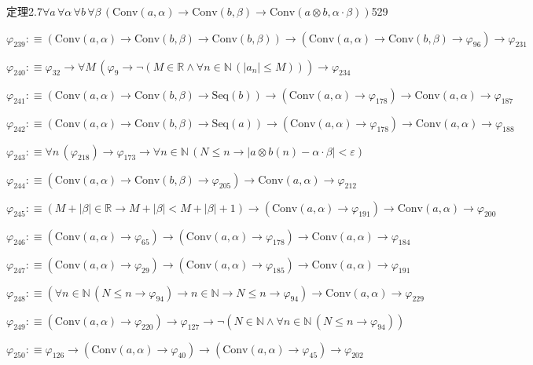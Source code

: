 \begin{fullproof}{定理2.7}{$\forall a\,\forall \alpha\,\forall b\,\forall \beta\,(\mathrm{Conv}(a,\alpha) \to \mathrm{Conv}(b,\beta) \to \mathrm{Conv}(a \otimes b,\alpha \cdot \beta))$}{529}
\begin{abbrevlist}
\item $\varphi_{239} :\equiv (\mathrm{Conv}(a,\alpha) \to \mathrm{Conv}(b,\beta) \to \mathrm{Conv}(b,\beta)) \to (\mathrm{Conv}(a,\alpha) \to \mathrm{Conv}(b,\beta) \to \varphi_{96}) \to \varphi_{231}$
\item $\varphi_{240} :\equiv \varphi_{32} \to \forall M\,(\varphi_{9} \to \neg (M \in \mathbb{R} \land \forall n \in \mathbb{N}\,(\lvert a_{n} \rvert \leq M))) \to \varphi_{234}$
\item $\varphi_{241} :\equiv (\mathrm{Conv}(a,\alpha) \to \mathrm{Conv}(b,\beta) \to \mathrm{Seq}(b)) \to (\mathrm{Conv}(a,\alpha) \to \varphi_{178}) \to \mathrm{Conv}(a,\alpha) \to \varphi_{187}$
\item $\varphi_{242} :\equiv (\mathrm{Conv}(a,\alpha) \to \mathrm{Conv}(b,\beta) \to \mathrm{Seq}(a)) \to (\mathrm{Conv}(a,\alpha) \to \varphi_{178}) \to \mathrm{Conv}(a,\alpha) \to \varphi_{188}$
\item $\varphi_{243} :\equiv \forall n\,(\varphi_{218}) \to \varphi_{173} \to \forall n \in \mathbb{N}\,(N \leq n \to \lvert a \otimes b(n) - \alpha \cdot \beta \rvert < \varepsilon)$
\item $\varphi_{244} :\equiv (\mathrm{Conv}(a,\alpha) \to \mathrm{Conv}(b,\beta) \to \varphi_{205}) \to \mathrm{Conv}(a,\alpha) \to \varphi_{212}$
\item $\varphi_{245} :\equiv (M + \lvert \beta \rvert \in \mathbb{R} \to M + \lvert \beta \rvert < M + \lvert \beta \rvert + 1) \to (\mathrm{Conv}(a,\alpha) \to \varphi_{191}) \to \mathrm{Conv}(a,\alpha) \to \varphi_{200}$
\item $\varphi_{246} :\equiv (\mathrm{Conv}(a,\alpha) \to \varphi_{65}) \to (\mathrm{Conv}(a,\alpha) \to \varphi_{178}) \to \mathrm{Conv}(a,\alpha) \to \varphi_{184}$
\item $\varphi_{247} :\equiv (\mathrm{Conv}(a,\alpha) \to \varphi_{29}) \to (\mathrm{Conv}(a,\alpha) \to \varphi_{185}) \to \mathrm{Conv}(a,\alpha) \to \varphi_{191}$
\item $\varphi_{248} :\equiv (\forall n \in \mathbb{N}\,(N \leq n \to \varphi_{94}) \to n \in \mathbb{N} \to N \leq n \to \varphi_{94}) \to \mathrm{Conv}(a,\alpha) \to \varphi_{229}$
\item $\varphi_{249} :\equiv (\mathrm{Conv}(a,\alpha) \to \varphi_{220}) \to \varphi_{127} \to \neg (N \in \mathbb{N} \land \forall n \in \mathbb{N}\,(N \leq n \to \varphi_{94}))$
\item $\varphi_{250} :\equiv \varphi_{126} \to (\mathrm{Conv}(a,\alpha) \to \varphi_{40}) \to (\mathrm{Conv}(a,\alpha) \to \varphi_{45}) \to \varphi_{202}$

\end{abbrevlist}
\end{fullproof}

